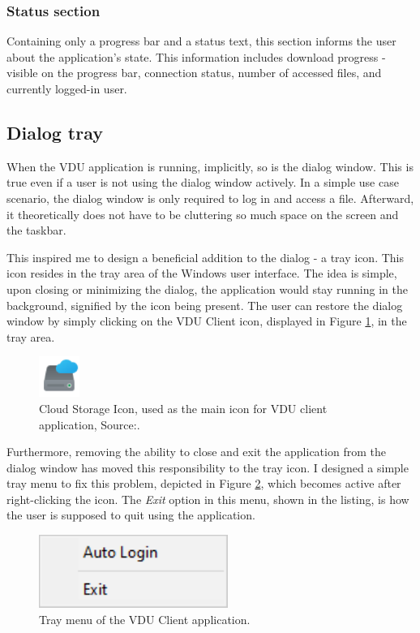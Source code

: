\subsubsection{Status section}
\label{statussectionui}
Containing only a progress bar and a status text, this section informs the user about the application's state. This information includes download progress - visible on the progress bar, connection status, number of accessed files, and currently logged-in user.

\subsection{Dialog tray}
When the VDU application is running, implicitly, so is the dialog window. This is true even if a user is not using the dialog window actively. In a simple use case scenario, the dialog window is only required to log in and access a file. Afterward, it theoretically does not have to be cluttering so much space on the screen and the taskbar. 

This inspired me to design a beneficial addition to the dialog - a tray icon. This icon resides in the tray area of the Windows user interface. The idea is simple, upon closing or minimizing the dialog, the application would stay running in the background, signified by the icon being present. The user can restore the dialog window by simply clicking on the VDU Client icon, displayed in Figure \ref{iconscloud}, in the tray area.

\begin{figure}[htb]
    \centering
	\includegraphics[width=50px]{obrazky-figures/cloudicon.pdf}
	\caption{Cloud Storage Icon, used as the main icon for VDU client application, Source:\cite{Icons8Cloud}.}
	\label{iconscloud}
\end{figure}

Furthermore, removing the ability to close and exit the application from the dialog window has moved this responsibility to the tray icon. I designed a simple tray menu to fix this problem, depicted in Figure \ref{traymenuex}, which becomes active after right-clicking the icon. The \textit{Exit} option in this menu, shown in the listing, is how the user is supposed to quit using the application.

\begin{figure}[htb]
    \centering
	\includegraphics[]{obrazky-figures/traymenu.pdf}
	\caption{Tray menu of the VDU Client application.}
	\label{traymenuex}
\end{figure}


